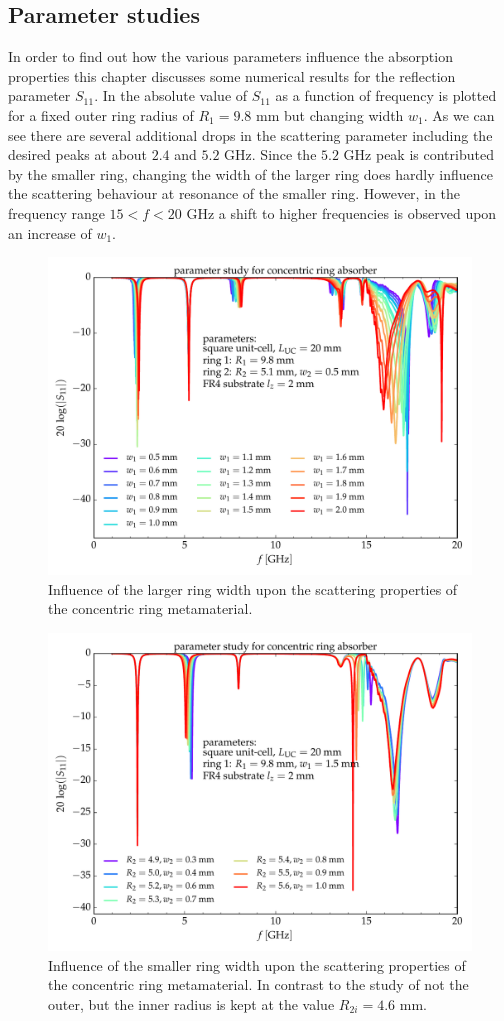\subsection{Parameter studies}
In order to find out how the various parameters influence the absorption properties this chapter discusses some numerical results for the reflection parameter $S_{11}$.
In  the absolute value of $S_{11}$ as a function of frequency is plotted for a fixed outer ring radius of $R_1=9.8$ mm but changing width $w_1$. As we can see there are several additional drops in the scattering parameter including the desired peaks at about $2.4$ and $5.2$ GHz. Since the $5.2$ GHz peak is contributed by the smaller ring, changing the width of the larger ring does hardly influence the scattering behaviour at resonance of the smaller ring. However, in the frequency range $15<f<20$ GHz a shift to higher frequencies is observed upon an increase of $w_1$. 

\begin{figure}
\centering
\includegraphics[width=0.75\linewidth]{./media/dual-wifi_absorber_w1.pdf}
\caption{Influence of the larger ring width upon the scattering properties of the concentric ring metamaterial.}
\label{fig:w1_sweep}
\end{figure}

\begin{figure}
\centering
\includegraphics[width=0.75\linewidth]{./media/dual-wifi_absorber_w2.pdf}
\caption{Influence of the smaller ring width upon the scattering properties of the concentric ring metamaterial. In contrast to the study of  not the outer, but the inner radius is kept at the value $R_{2i}=4.6$ mm.}
\label{fig:w2_sweep}
\end{figure}

